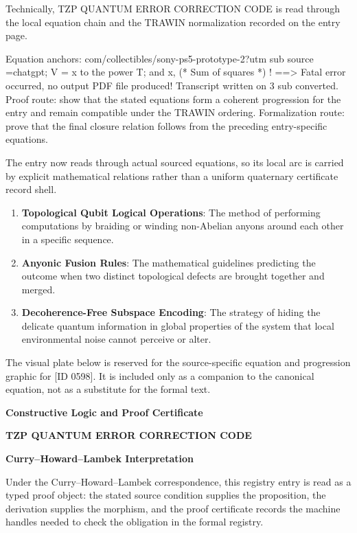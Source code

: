 Technically, TZP QUANTUM ERROR CORRECTION CODE is read through the local equation chain and the TRAWIN normalization recorded on the entry page.

Equation anchors: com/collectibles/sony-ps5-prototype-2?utm sub source =chatgpt; V  = x to the power T; and x, (* Sum of squares *) ! ==> Fatal error occurred, no output PDF file produced! Transcript written on 3 sub converted. Proof route: show that the stated equations form a coherent progression for the entry and remain compatible under the TRAWIN ordering. Formalization route: prove that the final closure relation follows from the preceding entry-specific equations.

The entry now reads through actual sourced equations, so its local arc is carried by explicit mathematical relations rather than a uniform quaternary certificate record shell.
\endgroup

\begin{enumerate}[leftmargin=1.6em,itemsep=6pt,topsep=4pt]
\item \textbf{Topological Qubit Logical Operations}: The method of performing computations by braiding or winding non-Abelian anyons around each other in a specific sequence.
\item \textbf{Anyonic Fusion Rules}: The mathematical guidelines predicting the outcome when two distinct topological defects are brought together and merged.
\item \textbf{Decoherence-Free Subspace Encoding}: The strategy of hiding the delicate quantum information in global properties of the system that local environmental noise cannot perceive or alter.
\end{enumerate}

\begingroup\footnotesize\sloppy
The visual plate below is reserved for the source-specific equation and progression graphic for [ID 0598]. It is included only as a companion to the canonical equation, not as a substitute for the formal text.
\par\endgroup
\ifTZPDarkEdition
{}
\fi

\clearpage
\begingroup\tzpsupportsetup
\noindent\textbf{\fontsize{10.8pt}{12.8pt}\selectfont [ID 0598] Constructive Logic and Proof Certificate}\par
\noindent\textbf{\fontsize{10pt}{12pt}\selectfont TZP QUANTUM ERROR CORRECTION CODE}\par
\vspace{0.45em}
\begingroup
\footnotesize
\setlength{\parskip}{0.22em}
\setlength{\parindent}{0pt}
\noindent\textbf{Curry--Howard--Lambek Interpretation}\par
Under the Curry--Howard--Lambek correspondence, this registry entry is read as a typed proof
object: the stated source condition supplies the proposition, the derivation supplies the
morphism, and the proof certificate records the machine handles needed to check the obligation
in the formal registry.

